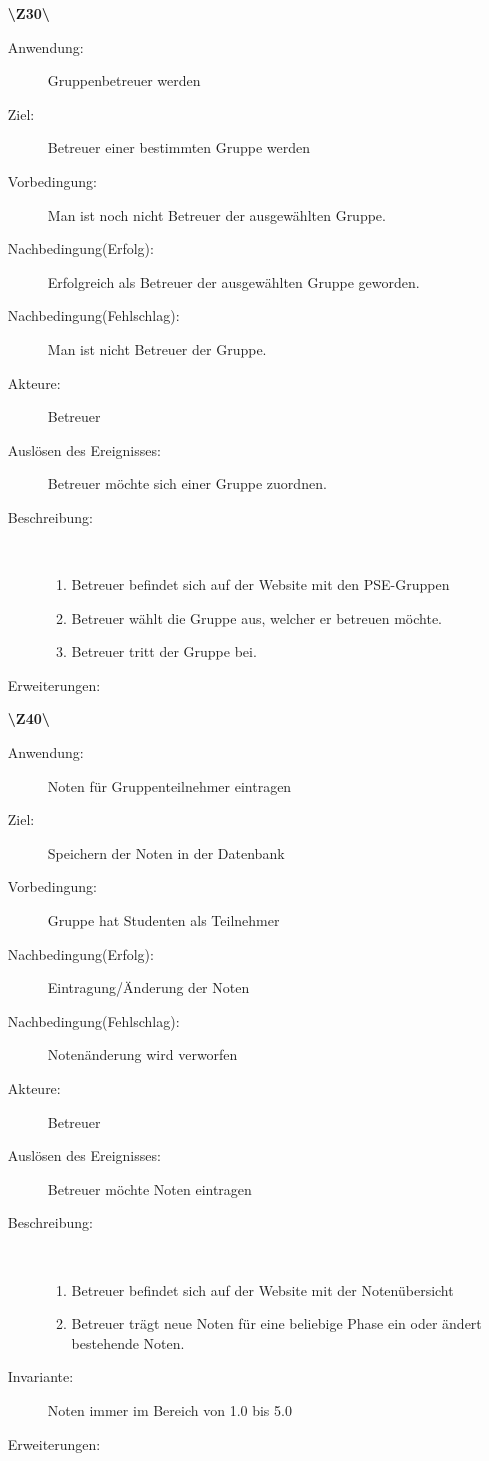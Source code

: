 \documentclass[a4paper]{article}
\begin{document}
\begin{enumerate}
\pagebreak
  \item[\textbf{\textbackslash Z30\textbackslash}]
	\begin{description}
  		\item[Anwendung:] Gruppenbetreuer werden
  		\item[Ziel:] Betreuer einer bestimmten Gruppe werden
  		\item[Vorbedingung:] Man ist noch nicht Betreuer der ausgewählten Gruppe.
  		\item[Nachbedingung(Erfolg):] Erfolgreich als Betreuer der ausgewählten Gruppe geworden.
  		\item[Nachbedingung(Fehlschlag):] Man ist nicht Betreuer der Gruppe.
  		\item[Akteure:] Betreuer
  		\item[Auslösen des Ereignisses:] Betreuer möchte sich einer Gruppe zuordnen.
  		\item[Beschreibung:]~
  	\begin{enumerate}[1.]
  	  \item Betreuer befindet sich auf der Website mit den PSE-Gruppen
  	  \item Betreuer wählt die Gruppe aus, welcher er betreuen möchte.
  	  \item Betreuer tritt der Gruppe bei.
  	\end{enumerate}
  	\item[Erweiterungen:]
  \end{description}
  \pagebreak
  \item[\textbf{\textbackslash Z40\textbackslash}] \begin{description}
  	\item[Anwendung:] Noten für Gruppenteilnehmer eintragen
  	\item[Ziel:] Speichern der Noten in der Datenbank
  	\item[Vorbedingung:] Gruppe hat Studenten als Teilnehmer
  	\item[Nachbedingung(Erfolg):] Eintragung/Änderung der Noten
  	\item[Nachbedingung(Fehlschlag):] Notenänderung wird verworfen
  	\item[Akteure:] Betreuer
  	\item[Auslösen des Ereignisses:] Betreuer möchte Noten eintragen
  	\item[Beschreibung:]~
  	\begin{enumerate}[1.]
  	  \item Betreuer befindet sich auf der Website mit der Notenübersicht
  	  \item Betreuer trägt neue Noten für eine beliebige Phase ein oder ändert bestehende Noten.
  	\end{enumerate}
  	\item[Invariante:] Noten immer im Bereich von 1.0 bis 5.0
  	\item[Erweiterungen:]
  \end{description}
\end{enumerate}
\end{document}
